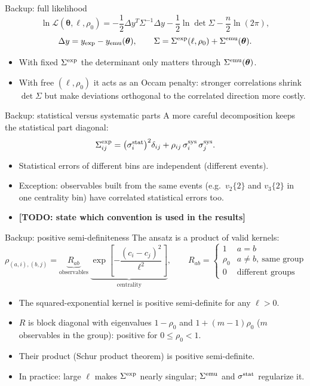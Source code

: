\documentclass[aspectratio=169,10pt]{beamer}
\newcommand{\Sexp}{\Sigma^{\rm exp}}
\newcommand{\Semu}{\Sigma^{\rm emu}}
\newcommand{\TODO}[1]{{\scriptsize\color{qcdRed}\textbf{[TODO: #1]}}}
\begin{document}
\begin{frame}{Backup: full likelihood}
\[
\ln \mathcal{L}(\boldsymbol{\theta},\ell,\rho_0) =
-\frac12 \Delta y^T\Sigma^{-1}\Delta y
-\frac12\ln\det\Sigma-\frac{n}{2}\ln(2\pi),
\]
\[
\Delta y=y_{\rm exp}-y_{\rm emu}(\boldsymbol{\theta}),\qquad
\Sigma=\Sexp(\ell,\rho_0)+\Semu(\boldsymbol{\theta}).
\]
\begin{itemize}
  \item With fixed $\Sexp$ the determinant only matters through $\Semu(\boldsymbol{\theta})$.
  \item With free $(\ell,\rho_0)$ it acts as an Occam penalty: stronger correlations shrink $\det\Sigma$ but make deviations orthogonal to the correlated direction more costly.
\end{itemize}
\end{frame}

\begin{frame}{Backup: statistical versus systematic parts}
A more careful decomposition keeps the statistical part diagonal:
\[
\Sexp_{ij}=\big(\sigma^{\rm stat}_i\big)^2\delta_{ij}
+\rho_{ij}\,\sigma^{\rm sys}_i\,\sigma^{\rm sys}_j .
\]
\begin{itemize}
  \item Statistical errors of different bins are independent (different events).
  \item Exception: observables built from the same events (e.g.\ $v_2\{2\}$ and $v_3\{2\}$ in one centrality bin) have correlated statistical errors too.
  \item \TODO{state which convention is used in the results}
\end{itemize}
\end{frame}

\begin{frame}{Backup: positive semi-definiteness}
The ansatz is a product of valid kernels:
\[
\rho_{(a,i),(b,j)}=
\underbrace{R_{ab}}_{\text{observables}}\;
\underbrace{\exp\!\left[-\frac{(c_i-c_j)^2}{\ell^2}\right]}_{\text{centrality}},
\qquad
R_{ab}=\begin{cases}1 & a=b\\ \rho_0 & a\neq b,\ \text{same group}\\ 0 & \text{different groups}\end{cases}
\]
\begin{itemize}
  \item The squared-exponential kernel is positive semi-definite for any $\ell>0$.
  \item $R$ is block diagonal with eigenvalues $1-\rho_0$ and $1+(m-1)\rho_0$ ($m$ observables in the group): positive for $0\le\rho_0<1$.
  \item Their product (Schur product theorem) is positive semi-definite.
  \item In practice: large $\ell$ makes $\Sexp$ nearly singular; $\Semu$ and $\sigma^{\rm stat}$ regularize it.
\end{itemize}
\end{frame}
\end{document}
